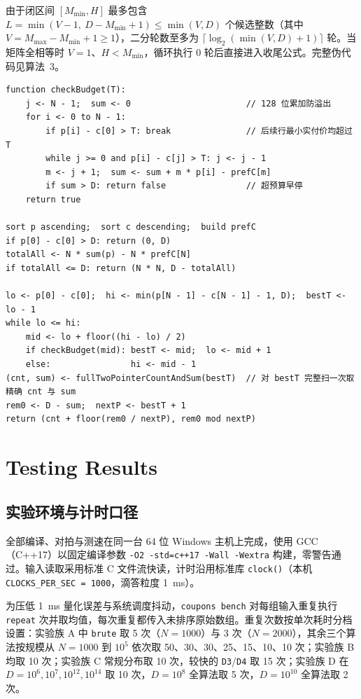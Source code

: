 \documentclass[12pt,a4paper,fontset=windows]{ctexart}
\theoremstyle{plain}
\newcommand{\code}[1]{\texttt{#1}}
\begin{document}
由于闭区间 $[M_{\min}, H]$ 最多包含 $L = \min(V-1,\ D - M_{\min} + 1) \le \min(V, D)$ 个候选整数（其中 $V = M_{\max}-M_{\min}+1 \ge 1$），二分轮数至多为 $\lceil \log_2(\min(V, D)+1) \rceil$ 轮。当矩阵全相等时 $V=1$、$H < M_{\min}$，循环执行 0 轮后直接进入收尾公式。完整伪代码见算法~3。

\begin{lstlisting}[float=htbp, title={算法 3：值域二分 + 单调双指针 + 前缀和（\code{bsearch}）}]
function checkBudget(T):
    j <- N - 1;  sum <- 0                       // 128 位累加防溢出
    for i <- 0 to N - 1:
        if p[i] - c[0] > T: break               // 后续行最小实付价均超过 T
        while j >= 0 and p[i] - c[j] > T: j <- j - 1
        m <- j + 1;  sum <- sum + m * p[i] - prefC[m]
        if sum > D: return false                // 超预算早停
    return true

sort p ascending;  sort c descending;  build prefC
if p[0] - c[0] > D: return (0, D)
totalAll <- N * sum(p) - N * prefC[N]
if totalAll <= D: return (N * N, D - totalAll)

lo <- p[0] - c[0];  hi <- min(p[N - 1] - c[N - 1] - 1, D);  bestT <- lo - 1
while lo <= hi:
    mid <- lo + floor((hi - lo) / 2)
    if checkBudget(mid): bestT <- mid;  lo <- mid + 1
    else:                hi <- mid - 1
(cnt, sum) <- fullTwoPointerCountAndSum(bestT)  // 对 bestT 完整扫一次取精确 cnt 与 sum
rem0 <- D - sum;  nextP <- bestT + 1
return (cnt + floor(rem0 / nextP), rem0 mod nextP)
\end{lstlisting}

\section{Testing Results}

\subsection{实验环境与计时口径}

全部编译、对拍与测速在同一台 64 位 Windows 主机上完成，使用 GCC（C++17）以固定编译参数 \code{-O2 -std=c++17 -Wall -Wextra} 构建，零警告通过。输入读取采用标准 C 文件流快读，计时沿用标准库 \code{clock()}（本机 \code{CLOCKS\_PER\_SEC = 1000}，滴答粒度 1~ms）。

为压低 1~ms 量化误差与系统调度抖动，\code{coupons bench} 对每组输入重复执行 \code{repeat} 次并取均值，每次重复都传入未排序原始数组。重复次数按单次耗时分档设置：实验族 A 中 \code{brute} 取 5 次（$N=1000$）与 3 次（$N=2000$），其余三个算法按规模从 $N=1000$ 到 $10^5$ 依次取 50、30、30、25、15、10、10 次；实验族 B 均取 10 次；实验族 C 常规分布取 10 次，较快的 \code{D3}/\code{D4} 取 15 次；实验族 D 在 $D=10^6,10^7,10^{12},10^{14}$ 取 10 次，$D=10^8$ 全算法取 5 次，$D=10^{10}$ 全算法取 2 次。
\end{document}
